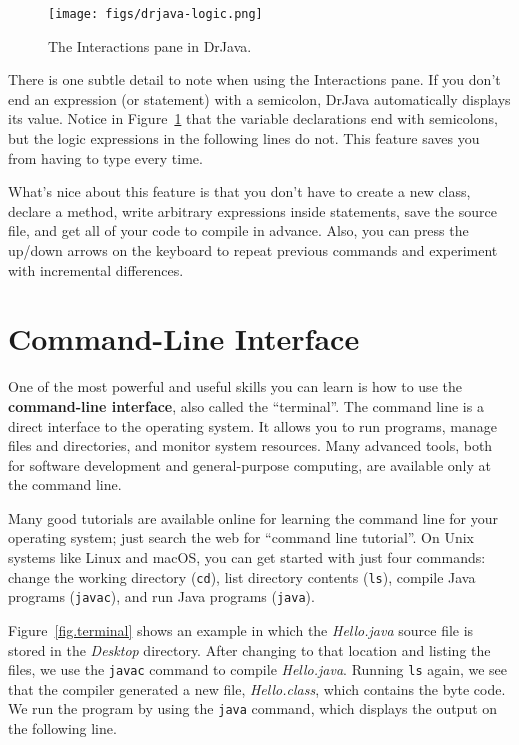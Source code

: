 
\begin{figure}[!ht]
\begin{center}
\texttt{[image: figs/drjava-logic.png]}
\caption{The Interactions pane in DrJava.}
\label{fig.drjava2}
\end{center}
\end{figure}

There is one subtle detail to note when using the Interactions pane.
If you don't end an expression (or statement) with a semicolon, DrJava automatically displays its value.
Notice in Figure~\ref{fig.drjava2} that the variable declarations end with semicolons, but the logic expressions in the following lines do not.
This feature saves you from having to type  every time.

What's nice about this feature is that you don't have to create a new class, declare a  method, write arbitrary expressions inside  statements, save the source file, and get all of your code to compile in advance.
Also, you can press the up/down arrows on the keyboard to repeat previous commands and experiment with incremental differences.


\section{Command-Line Interface}
\label{tools_commandline-interface}


One of the most powerful and useful skills you can learn is how to use the {\bf command-line interface}, also called the ``terminal''.
The command line is a direct interface to the operating system.
It allows you to run programs, manage files and directories, and monitor system resources.
Many advanced tools, both for software development and general-purpose computing, are available only at the command line.


Many good tutorials are available online for learning the command line for your operating system; just search the web for ``command line tutorial''.
On Unix systems like Linux and macOS, you can get started with just four commands: change the working directory ({\tt cd}), list directory contents ({\tt ls}), compile Java programs ({\tt javac}), and run Java programs ({\tt java}).

Figure~\ref{fig.terminal} shows an example in which the {\it Hello.java} source file is stored in the {\it Desktop} directory.
After changing to that location and listing the files, we use the {\tt javac} command to compile {\it Hello.java}.
Running {\tt ls} again, we see that the compiler generated a new file, {\it Hello.class}, which contains the byte code.
We run the program by using the {\tt java} command, which displays the output on the following line.

